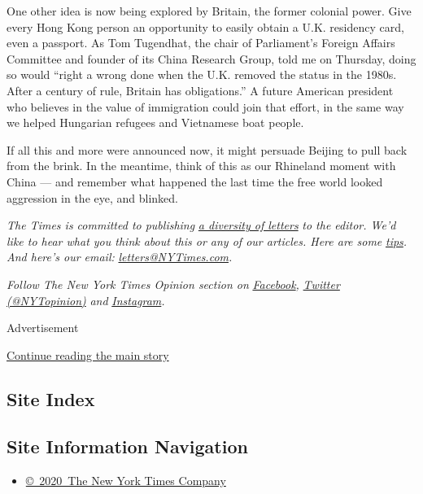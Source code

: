 One other idea is now being explored by Britain, the former colonial
power. Give every Hong Kong person an opportunity to easily obtain a
U.K. residency card, even a passport. As Tom Tugendhat, the chair of
Parliament's Foreign Affairs Committee and founder of its China Research
Group, told me on Thursday, doing so would ``right a wrong done when the
U.K. removed the status in the 1980s. After a century of rule, Britain
has obligations.'' A future American president who believes in the value
of immigration could join that effort, in the same way we helped
Hungarian refugees and Vietnamese boat people.

If all this and more were announced now, it might persuade Beijing to
pull back from the brink. In the meantime, think of this as our
Rhineland moment with China --- and remember what happened the last time
the free world looked aggression in the eye, and blinked.

\emph{The Times is committed to publishing}
\href{https://www.nytimes3xbfgragh.onion/2019/01/31/opinion/letters/letters-to-editor-new-york-times-women.html}{\emph{a
diversity of letters}} \emph{to the editor. We'd like to hear what you
think about this or any of our articles. Here are some}
\href{https://help.nytimes3xbfgragh.onion/hc/en-us/articles/115014925288-How-to-submit-a-letter-to-the-editor}{\emph{tips}}\emph{.
And here's our email:}
\href{mailto:letters@NYTimes.com}{\emph{letters@NYTimes.com}}\emph{.}

\emph{Follow The New York Times Opinion section on}
\href{https://www.facebookcorewwwi.onion/nytopinion}{\emph{Facebook}}\emph{,}
\href{http://twitter.com/NYTOpinion}{\emph{Twitter (@NYTopinion)}}
\emph{and}
\href{https://www.instagram.com/nytopinion/}{\emph{Instagram}}\emph{.}

Advertisement

\protect\hyperlink{after-bottom}{Continue reading the main story}

\hypertarget{site-index}{%
\subsection{Site Index}\label{site-index}}

\hypertarget{site-information-navigation}{%
\subsection{Site Information
Navigation}\label{site-information-navigation}}

\begin{itemize}
\tightlist
\item
  \href{https://help.nytimes3xbfgragh.onion/hc/en-us/articles/115014792127-Copyright-notice}{©~2020~The
  New York Times Company}
\end{itemize}

